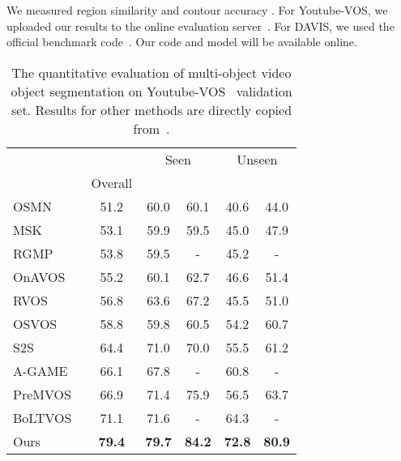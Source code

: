 \documentclass[10pt,twocolumn,letterpaper]{article}
\begin{document}
We measured region similarity  and contour accuracy . 
For Youtube-VOS, we uploaded our results to the online evaluation server~\cite{xu2018youtube_tech}.
For DAVIS, we used the official benchmark code~\cite{Perazzi2016}. 
Our code and model will be available online.



\begin{table}
\centering 
\begin{tabular}{lccccc}
\toprule
 & & \multicolumn{2}{c}{Seen} & \multicolumn{2}{c}{Unseen} \\
\cmidrule(lr){3-4}
\cmidrule(lr){5-6}
&  Overall &  &  &   & \\
\midrule
OSMN~\cite{yang2018efficient} & 51.2 & 60.0 & 60.1 & 40.6 & 44.0 \\
MSK~\cite{perazzi2017learning} & 53.1 & 59.9 & 59.5 & 45.0 & 47.9 \\
RGMP~\cite{oh2018fast} & 53.8 & 59.5 & - & 45.2 & - \\
OnAVOS~\cite{voigtlaender2017online} & 55.2 & 60.1 & 62.7 & 46.6 & 51.4 \\
RVOS~\cite{rvos2019} & 56.8 & 63.6 & 67.2 & 45.5 & 51.0 \\
OSVOS~\cite{caelles2017one} & 58.8 & 59.8 & 60.5 & 54.2 & 60.7 \\
S2S~\cite{xu2018youtube} & 64.4 & 71.0 & 70.0 & 55.5 & 61.2 \\
A-GAME~\cite{joakim2018generative} & 66.1 & 67.8 & - & 60.8 & - \\
PreMVOS~\cite{luiten2018premvos} & 66.9 & 71.4 & 75.9 & 56.5 & 63.7 \\
BoLTVOS~\cite{voigtlaender2019boltvos}  & 71.1 & 71.6 & - & 64.3 & - \\
\midrule
Ours & \textbf{79.4} & \textbf{79.7} & \textbf{84.2} &  \textbf{72.8} & \textbf{80.9} \\

\bottomrule
\end{tabular}
\caption{The quantitative evaluation of multi-object video object segmentation on Youtube-VOS~\cite{xu2018youtube} validation set. Results for other methods are directly copied from~\cite{xu2018youtube_tech, joakim2018generative, rvos2019, voigtlaender2019boltvos}.}
\label{Table:ytvos}
\end{table}
\end{document}
